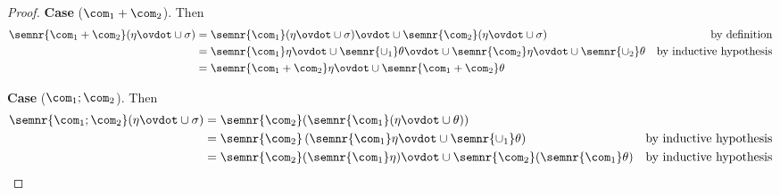 \begin{proof}


  \medskip 

  \noindent
  \textbf{Case}  (\(\com_1 + \com_2\)).
  Then
  \begin{align*}
    \semnr{\com_1 + \com_2}(\eta \ovdot\cup \sigma) & = \semnr{\com_1}(\eta \ovdot\cup \sigma) \ovdot\cup \semnr{\com_2}(\eta \ovdot\cup \sigma) & \text{by definition}\\
                                                    & = \semnr{\com_1}\eta \ovdot\cup \semnr{\cup_1}\theta \ovdot\cup \semnr{\com_2}\eta \ovdot\cup \semnr{\cup_2}\theta & \text{by inductive hypothesis} \\
                                                    & = \semnr{\com_1 + \com_2}\eta \ovdot\cup \semnr{\com_1 + \com_2}\theta
  \end{align*}

  \medskip

  \noindent
  \textbf{Case}  (\(\com_1 ; \com_2\)).
  Then
  \begin{align*}
    \semnr{\com_1 ; \com_2}(\eta \ovdot\cup \sigma) & = \semnr{\com_2}(\semnr{\com_1}(\eta \ovdot\cup \theta)) \\
                                                    & = \semnr{\com_2}\left(\semnr{\com_1}\eta \ovdot\cup \semnr{\cup_1}\theta\right) & \text{by inductive hypothesis} \\
                                                    & = \semnr{\com_2}(\semnr{\com_1}\eta) \ovdot\cup \semnr{\com_2}(\semnr{\com_1}\theta) & \text{by inductive hypothesis}
  \end{align*}

  \medskip


\end{proof}
